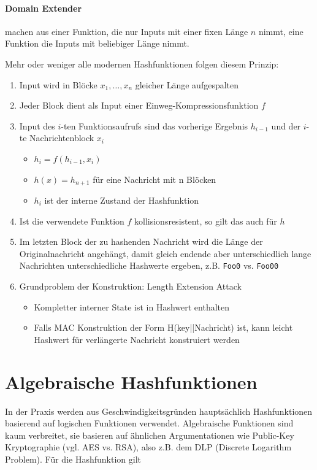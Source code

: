 \paragraph{Domain Extender} machen aus einer Funktion, die nur Inputs mit einer fixen Länge $n$ nimmt, eine Funktion die Inputs mit beliebiger Länge nimmt. 

Mehr oder weniger alle modernen Hashfunktionen folgen diesem Prinzip:

\begin{enumerate}
    \item Input wird in Blöcke $x_1, \ldots, x_n$ gleicher Länge aufgespalten
    \item Jeder Block dient als Input einer Einweg-Kompressionsfunktion $f$
    \item Input des $i$-ten Funktionsaufrufs sind das vorherige Ergebnis $h_{i-1}$ und der $i$-te Nachrichtenblock $x_i$
    \begin{itemize}
        \item $h_i = f(h_{i-1}, x_i)$
        \item $h(x) = h_{n+1}$ für eine Nachricht mit {n} Blöcken
        \item $h_i$ ist der interne Zustand der Hashfunktion
    \end{itemize}
    \item Ist die verwendete Funktion $f$ kollisionsresistent, so gilt das auch für $h$
    \item Im letzten Block der zu hashenden Nachricht wird die Länge der Originalnachricht angehängt, damit gleich endende aber unterschiedlich lange Nachrichten 
    unterschiedliche Hashwerte ergeben, z.B. \verb|Foo0| vs. \verb|Foo00|
    \item Grundproblem der Konstruktion: Length Extension Attack
    \begin{itemize}
        \item Kompletter interner State ist in Hashwert enthalten
        \item Falls MAC Konstruktion der Form H(key||Nachricht) ist, kann leicht Hashwert für verlängerte Nachricht konstruiert werden
    \end{itemize}
\end{enumerate}

\section{Algebraische Hashfunktionen}

In der Praxis werden aus Geschwindigkeitsgründen hauptsächlich Hashfunktionen
basierend auf logischen Funktionen verwendet. Algebraische Funktionen sind kaum verbreitet, sie basieren auf ähnlichen Argumentationen wie
Public-Key Kryptographie (vgl. AES vs. RSA), also z.B. dem DLP (Discrete Logarithm Problem). Für die Hashfunktion gilt 

